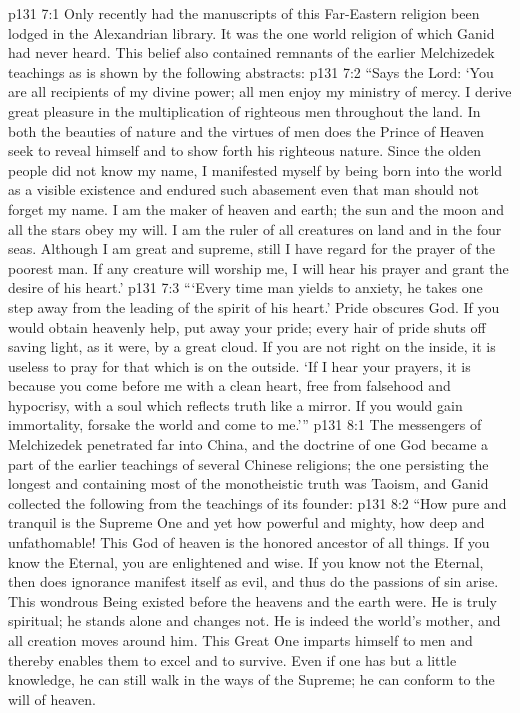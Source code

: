\vs p131 7:1 Only recently had the manuscripts of this Far\hyp{}Eastern religion been lodged in the Alexandrian library. It was the one world religion of which Ganid had never heard. This belief also contained remnants of the earlier Melchizedek teachings as is shown by the following abstracts:
\vs p131 7:2 \pc “Says the Lord: ‘You are all recipients of my divine power; all men enjoy my ministry of mercy. I derive great pleasure in the multiplication of righteous men throughout the land. In both the beauties of nature and the virtues of men does the Prince of Heaven seek to reveal himself and to show forth his righteous nature. Since the olden people did not know my name, I manifested myself by being born into the world as a visible existence and endured such abasement even that man should not forget my name. I am the maker of heaven and earth; the sun and the moon and all the stars obey my will. I am the ruler of all creatures on land and in the four seas. Although I am great and supreme, still I have regard for the prayer of the poorest man. If any creature will worship me, I will hear his prayer and grant the desire of his heart.’
\vs p131 7:3 “‘Every time man yields to anxiety, he takes one step away from the leading of the spirit of his heart.’ Pride obscures God. If you would obtain heavenly help, put away your pride; every hair of pride shuts off saving light, as it were, by a great cloud. If you are not right on the inside, it is useless to pray for that which is on the outside. ‘If I hear your prayers, it is because you come before me with a clean heart, free from falsehood and hypocrisy, with a soul which reflects truth like a mirror. If you would gain immortality, forsake the world and come to me.’”
\vs p131 8:1 The messengers of Melchizedek penetrated far into China, and the doctrine of one God became a part of the earlier teachings of several Chinese religions; the one persisting the longest and containing most of the monotheistic truth was Taoism, and Ganid collected the following from the teachings of its founder:
\vs p131 8:2 \pc “How pure and tranquil is the Supreme One and yet how powerful and mighty, how deep and unfathomable! This God of heaven is the honored ancestor of all things. If you know the Eternal, you are enlightened and wise. If you know not the Eternal, then does ignorance manifest itself as evil, and thus do the passions of sin arise. This wondrous Being existed before the heavens and the earth were. He is truly spiritual; he stands alone and changes not. He is indeed the world’s mother, and all creation moves around him. This Great One imparts himself to men and thereby enables them to excel and to survive. Even if one has but a little knowledge, he can still walk in the ways of the Supreme; he can conform to the will of heaven.

